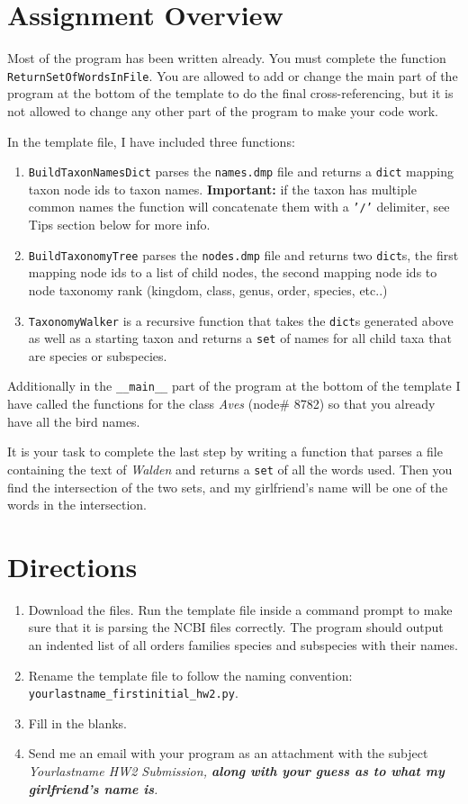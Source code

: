 \documentclass[11pt]{amsart}
\begin{document}
\section*{Assignment Overview}
Most of the program has been written already. You must complete the function \\ \texttt{ReturnSetOfWordsInFile}. You are allowed to add or change the main part of the program at the bottom of the template to do the final cross-referencing, but it is not allowed to change any other part of the program to make your code work.

In the template file, I have included three functions:
\begin{enumerate}
	\item \texttt{BuildTaxonNamesDict} parses the \texttt{names.dmp} file and returns a \texttt{dict} mapping taxon node ids to taxon names. \textbf{Important:} if the taxon has multiple common names the function will concatenate them with a \texttt{'/'} delimiter, see Tips section below for more info.
	\item \texttt{BuildTaxonomyTree} parses the \texttt{nodes.dmp} file and returns two \texttt{dict}s, the first mapping node ids to a list of child nodes, the second mapping node ids to node taxonomy rank (kingdom, class, genus, order, species, etc..)
	\item \texttt{TaxonomyWalker} is a recursive function that takes the \texttt{dict}s generated above as well as a starting taxon and returns a \texttt{set} of names for all child taxa that are species or subspecies.
\end{enumerate}
Additionally in the \texttt{__main__} part of the program at the bottom of the template I have called the functions for the class \textit{Aves} (node\# 8782) so that you already have all the bird names.

It is your task to complete the last step by writing a function that parses a file containing the text of \textit{Walden} and returns a \texttt{set} of all the words used. Then you find the intersection of the two sets, and my girlfriend's name will be one of the words in the intersection.

\section*{Directions}
\begin{enumerate}
	\item Download the files. Run the template file inside a command prompt to make sure that it is parsing the NCBI files correctly. The program should output an indented list of all orders families species and subspecies with their names.
	\item Rename the template file to follow the naming convention: \\ \texttt{yourlastname_firstinitial_hw2.py}.
	\item Fill in the blanks.
	\item Send me an email with your program as an attachment with the subject \em{Yourlastname HW2 Submission}, \textbf{along with your guess as to what my girlfriend's name is}.
\end{enumerate}
\end{document}
